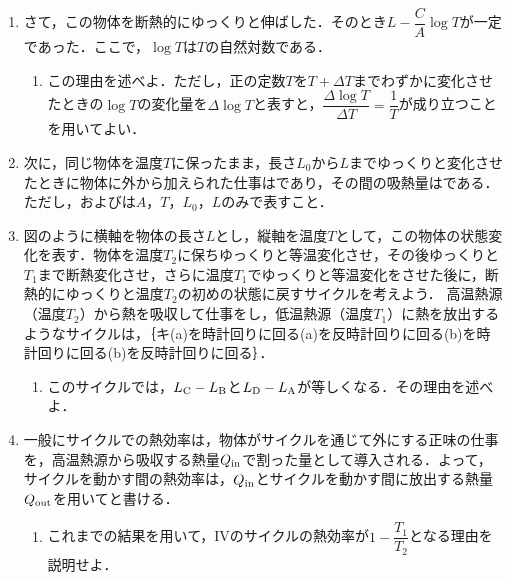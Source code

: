 \begin{enumerate}[I, leftmargin=2\zw]
    断熱的に物体をゆっくりと微小量$\varDelta L$伸ばしたときの温度変化$\varDelta T$は，$C$，$A$，$T$，$\varDelta L$を用いて表すととなり，温度は｛エ\hs{1\zw} 下降する\hs{1\zw}変わらない\hs{1\zw}上昇する｝．ただし，$\varDelta L > 0$とする．
  \item さて，この物体を断熱的にゆっくりと伸ばした．そのとき$L - \dfrac{C}{A} \log T$が一定であった．ここで，$\log T$は$T$の自然対数である．
    \begin{enumerate}[(1)]
      \item この理由を述べよ．ただし，正の定数$T$を$T + \varDelta T$までわずかに変化させたときの$\log T$の変化量を$\varDelta \log T$と表すと，$\dfrac{\varDelta \log T}{\varDelta T} = \dfrac{1}{T}$が成り立つことを用いてよい．
    \end{enumerate}
  \item 次に，同じ物体を温度$T$に保ったまま，長さ$L_0$から$L$までゆっくりと変化させたときに物体に外から加えられた仕事はであり，その間の吸熱量はである．ただし，およびは$A$，$T$，$L_0$，$L$のみで表すこと．
  \item
    図のように横軸を物体の長さ$L$とし，縦軸を温度$T$として，この物体の状態変化を表す．物体を温度$T_2$に保ちゆっくりと等温変化させ，その後ゆっくりと$T_1$まで断熱変化させ，さらに温度$T_1$でゆっくりと等温変化をさせた後に，断熱的にゆっくりと温度$T_2$の初めの状態に戻すサイクルを考えよう．
    高温熱源（温度$T_2$）から熱を吸収して仕事をし，低温熱源（温度$T_1$）に熱を放出するようなサイクルは，｛キ\hs{1\zw}(a)を時計回りに回る\hs{1\zw}(a)を反時計回りに回る\hs{1\zw}(b)を時計回りに回る\hs{1\zw}(b)を反時計回りに回る｝．
    \begin{enumerate}[(1), resume]
      \item このサイクルでは，$L_\mathrm{C} - L_\mathrm{B}$と$L_\mathrm{D} - L_\mathrm{A}$が等しくなる．その理由を述べよ．
    \end{enumerate}
  \item 一般にサイクルでの熱効率は，物体がサイクルを通じて外にする正味の仕事を，高温熱源から吸収する熱量$Q_\mathrm{in}$で割った量として導入される．よって，サイクルを動かす間の熱効率は，$Q_\mathrm{in}$とサイクルを動かす間に放出する熱量$Q_\mathrm{out}$を用いてと書ける．
    \begin{enumerate}[(1), resume]
      \item これまでの結果を用いて，IVのサイクルの熱効率が$1 - \dfrac{T_1}{T_2}$となる理由を説明せよ．
    \end{enumerate}
\end{enumerate}


